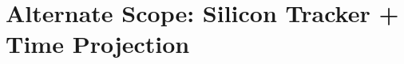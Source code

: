 \documentclass[11pt,twoside,notitlepage]{book}
\begin{document}
\frontmatter

\pagestyle{fancy}

\mainmatter

\setcounter{chapter}{1}
\setcounter{page}{1}
\appendix

\chapter{Alternate Scope: Silicon Tracker + Time Projection}





\end{document}
